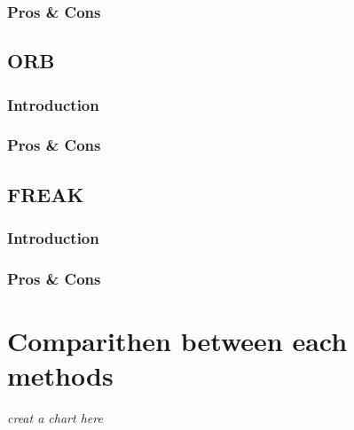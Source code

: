 		\subsubsection{Pros \& Cons}
	\subsection{ORB}
		\subsubsection{Introduction}
		\subsubsection{Pros \& Cons}
	\subsection{FREAK}
		\subsubsection{Introduction}
		\subsubsection{Pros \& Cons}

\section{Comparithen between each methods}
\emph{creat a chart here}